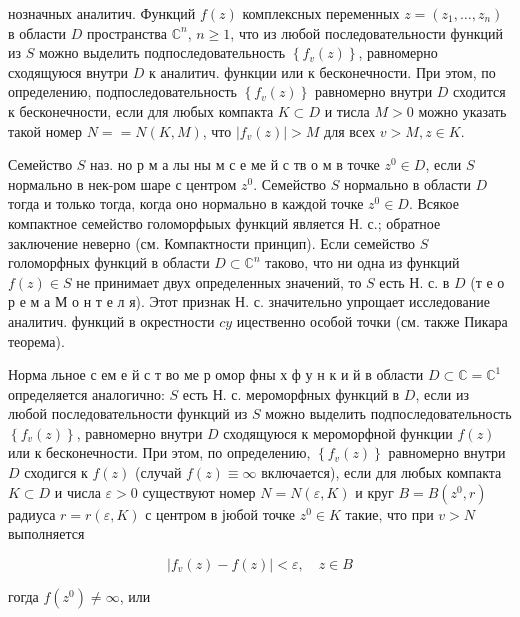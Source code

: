 \documentclass[10pt]{article}
\begin{document}
нозначных аналитич. Функций $f(z)$ комплексных переменных $z=\left(z_{1}, \ldots, z_{n}\right)$ в области $D$ пространства $\mathbb{C}^{n}$, $n \geqslant 1$, что из любой последовательности функций из $S$ можно выделить подпоследовательность $\left\{f_{v}(z)\right\}$, равномерно сходящуюся внутри $D$ к аналитич. функции или к бесконечности. При этом, по определению, подпоследовательность $\left\{f_{v}(z)\right\}$ равномерно внутри $D$ сходится к бесконечности, если для любых компакта $K \subset D$ и тисла $M>0$ можно указать такой номер $N==N(K, M)$, что $\left|f_{v}(z)\right|>M$ для всех $v>M, z \in K$.



Семейство $S$ наз. но р м а лы ны м с е ме й с тв о м в точке $z^{0} \in D$, если $S$ нормально в нек-ром шаре с центром $z^{0}$. Семейство $S$ нормально в области $D$ тогда и только тогда, когда оно нормально в каждой точке $z^{0} \in D$. Всякое компактное семейство голоморфыых функций является Н. с.; обратное заключение неверно (см. Компактности принцип). Если семейство $S$ голоморфных функций в области $D \subset \mathbb{C}^{n}$ таково, что ни одна из функций $f(z) \in S$ не принимает двух определенных значений, то $S$ есть Н. с. в $D$ (т е о р е м а М о н т е л я). Этот признак Н. с. значительно упрощает исследование аналитич. функций в окрестности $c y$ ицественно особой точки (см. также Пикара теорема).



Норма льное с ем е й с т во ме р омор фны х ф у н к и й в области $D \subset \mathbb{C}=\mathbb{C}^{1}$ определяется аналогично: $S$ есть Н. с. мероморфных функций в $D$, если из любой последовательности функций из $S$ можно выделить подпоследовательность $\left\{f_{v}(z)\right\}$, равномерно внутри $D$ сходящуюся к мероморфной функции $f(z)$ или к бесконечности. При этом, по определению, $\left\{f_{v}(z)\right\}$ равномерно внутри $D$ сходигся к $f(z)$ (случай $f(z) \equiv \infty$ включается), если для любых компакта $K \subset D$ и числа $\varepsilon>0$ существуют номер $N=N(\varepsilon, K)$ и круг $B=B\left(z^{0}, r\right)$ радиуса $r=r(\varepsilon, K)$ с центром в јюбой точке $z^{0} \in K$ такие, что при $v>N$ выполняется



\[

\left|f_{v}(z)-f(z)\right|<\varepsilon, \quad z \in B

\]



гогда $f\left(z^{0}\right) \neq \infty$, или
\end{document}

